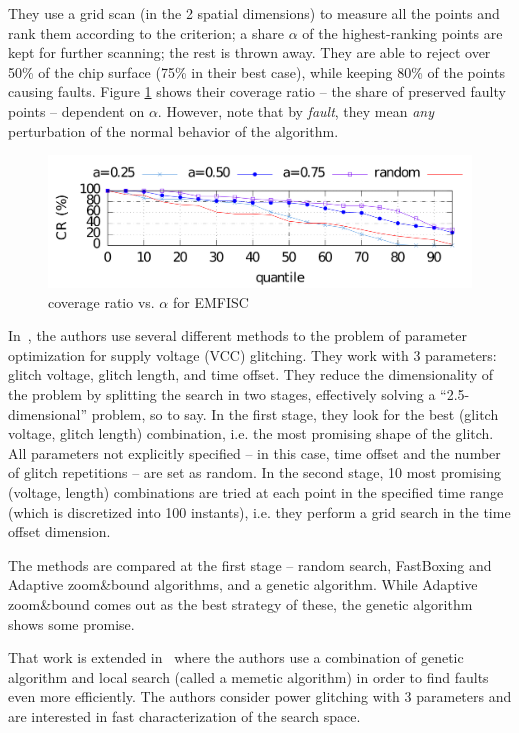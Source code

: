 \documentclass[times, utf8, diplomski]{fer}
\begin{document}
They use a grid scan (in the 2 spatial dimensions) to measure all the points
and rank them according to the criterion; a share $\alpha$ of the highest-ranking
points are kept for further scanning; the rest is thrown away.
They are able to reject over 50\% of the chip surface (75\% in their best case),
while keeping 80\% of the points causing faults. Figure \ref{fig:emfisc} shows
their coverage ratio -- the share of preserved faulty points -- dependent on $\alpha$.
However, note that by \emph{fault}, they mean \emph{any} perturbation of the
normal behavior of the algorithm.

\begin{figure}[htb]
    \centering
    \includegraphics{images/emfisc.png}
    \caption{coverage ratio vs. $\alpha$ for EMFISC}
    \label{fig:emfisc}
\end{figure}


In~\cite{GlitchItIfYouCan}, the authors use several different methods to the
problem of parameter optimization for supply voltage (VCC) glitching. They work
with 3 parameters: glitch voltage, glitch length, and time offset. They reduce
the dimensionality of the problem by splitting the search in two stages,
effectively solving a ``2.5-dimensional'' problem, so to say. In the first stage,
they look for the best (glitch voltage, glitch length) combination, i.e. the
most promising shape of the glitch. All parameters not explicitly specified
 -- in this case, time offset and the number of glitch repetitions -- are
set as random. In the second stage, 10 most promising (voltage, length)
combinations are tried at each point in the specified time range (which is
discretized into 100 instants), i.e. they perform a grid search in the time
offset dimension.

The methods are compared at the first stage -- random search, FastBoxing and
Adaptive zoom\&bound algorithms, and a genetic algorithm. While Adaptive
zoom\&bound comes out as the best strategy of these, the genetic algorithm
shows some promise. 

That work is extended in~\cite{FI_memetic} where the authors use a combination of
genetic algorithm and local search (called a memetic algorithm) in order to find
faults even more efficiently. The authors consider power glitching with 3
parameters and are interested in fast characterization of the search space.
\end{document}
